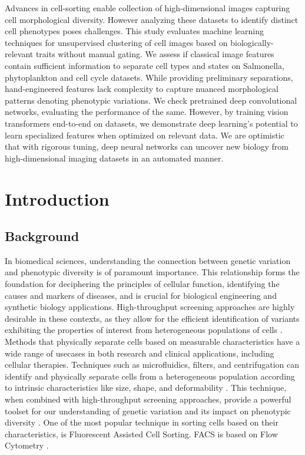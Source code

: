 \documentclass[12pt,a4paper]{article}
\begin{document}
Advances in cell-sorting enable collection of high-dimensional images capturing cell morphological diversity. However analyzing these datasets to identify distinct cell phenotypes poses challenges. This study evaluates machine learning techniques for unsupervised clustering of cell images based on biologically-relevant traits without manual gating. We assess if classical image features contain sufficient information to separate cell types and states on Salmonella, phytoplankton and cell cycle datasets. While providing preliminary separations, hand-engineered features lack complexity to capture nuanced morphological patterns denoting phenotypic variations. We check pretrained deep convolutional networks, evaluating the performance of the same. However, by training vision transformers end-to-end on datasets, we demonstrate deep learning's potential to learn specialized features when optimized on relevant data. We are optimistic that with rigorous tuning, deep neural networks can uncover new biology from high-dimensional imaging datasets in an automated manner.

\newpage
\section{Introduction}
\label{intro}

\subsection{Background}

In biomedical sciences, understanding the connection between genetic variation and phenotypic diversity is of paramount importance. This relationship forms the foundation for deciphering the principles of cellular function, identifying the causes and markers of diseases, and is crucial for biological engineering and synthetic biology applications. High-throughput screening approaches are highly desirable in these contexts, as they allow for the efficient identification of variants exhibiting the properties of interest from heterogeneous populations of cells \cite{Pegoraro2017-rs}. Methods that physically separate cells based on measurable characteristics have a wide range of usecases in both research and clinical applications, including cellular therapies. Techniques such as microfluidics, filters, and centrifugation can identify and physically separate cells from a heterogeneous population according to intrinsic characteristics like size, shape, and deformability \cite{https://doi.org/10.1002/bit.22833}. This technique, when combined with high-throughput screening approaches, provide a powerful toolset for our understanding of genetic variation and its impact on phenotypic diversity \cite{vandereyken_sifrim_thienpont_voet_2023}. One of the most popular technique in sorting cells based on their characteristics, is Fluorescent Assisted Cell Sorting. FACS is based on Flow Cytometry \cite{liao_makris_luo_2016}.
\end{document}
